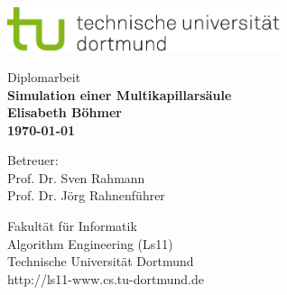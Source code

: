 \begin{titlepage}
\vspace*{-2cm}
\newlength{\links}
\setlength{\links}{-1.5cm}
\sf
\LARGE

\hspace*{\links}
\begin{minipage}{12.5cm}
\includegraphics[width=8cm]{bilder/tulogo-rgb}
\end{minipage}

\vspace*{4cm}

\hspace*{\links}
\hspace*{-0.2cm}
\begin{minipage}{9cm}
\large
\begin{center}
{\Large Diplomarbeit} \\
\vspace*{1cm}
\bf{ Simulation einer Multikapillarsäule} \\
\vspace*{1.5cm}
Elisabeth Böhmer\\
\today
\end{center}
\end{minipage}

\vspace*{5.5cm}

\hspace*{\links}

\vspace*{1.5cm}

\vspace*{.6cm}

\hspace*{\links}
\begin{minipage}[b]{5cm}
\normalsize
\raggedright
Betreuer: \\
Prof. Dr. Sven Rahmann \\
Prof. Dr. Jörg Rahnenführer \\
\end{minipage}

\vspace*{2.5cm}
\hspace*{\links}
\begin{minipage}[b]{8cm}
\normalsize
\raggedright
Fakultät für Informatik\\
Algorithm Engineering (Ls11)\\
Technische Universität Dortmund \\
http://ls11-www.cs.tu-dortmund.de
\end{minipage}


\end{titlepage}
